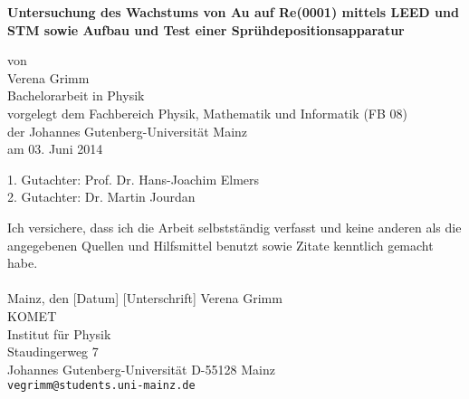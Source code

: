\documentclass[a4paper,11pt,oneside,final,german,openbib,pdftex]{scrbook}
\begin{document}

\begin{titlepage}
  \vspace*{6mm}
  \begin{center}
  \linespread{1.3}
     {\sffamily \bfseries \Huge  %
     Untersuchung des Wachstums von Au auf Re(0001) mittels LEED und STM
     sowie Aufbau und Test einer Sprühdepositionsapparatur\par}
     \vspace*{3.5cm}
     {\large von}
     \\[3.5cm]
     \linespread{1}
     {\dfont Verena Grimm}
     \\[2cm]
     {\large Bachelorarbeit in Physik \/\\
        vorgelegt dem Fachbereich Physik, Mathematik und Informatik (FB 08) \/\\
        der Johannes Gutenberg-Universit\"at Mainz \/\\
        am 03. Juni 2014}
   \end{center}
   \vfill
   1. Gutachter: Prof. Dr. Hans-Joachim Elmers\\
   2. Gutachter: Dr. Martin Jourdan\\
   \vfill
\end{titlepage}



\thispagestyle{empty}
Ich versichere, dass ich die Arbeit selbstst\"andig verfasst und keine
anderen als die angegebenen Quellen und Hilfsmittel benutzt sowie
Zitate kenntlich gemacht habe.
\\
\\[3.5cm]
Mainz, den [Datum] [Unterschrift]
\vfill
\noindent
Verena Grimm\\
KOMET\\
Institut f\"ur Physik\\
Staudingerweg 7\\
Johannes Gutenberg-Universit\"at
D-55128 Mainz\\
{\tt vegrimm@students.uni-mainz.de}

\renewcommand\contentsname{Inhaltsverzeichnis}
\renewcommand\figurename{Abbildung}
\renewcommand\tablename{Tabelle}
\tableofcontents
\clearpage 

\mainmatter  
\sloppy

\end{document}
